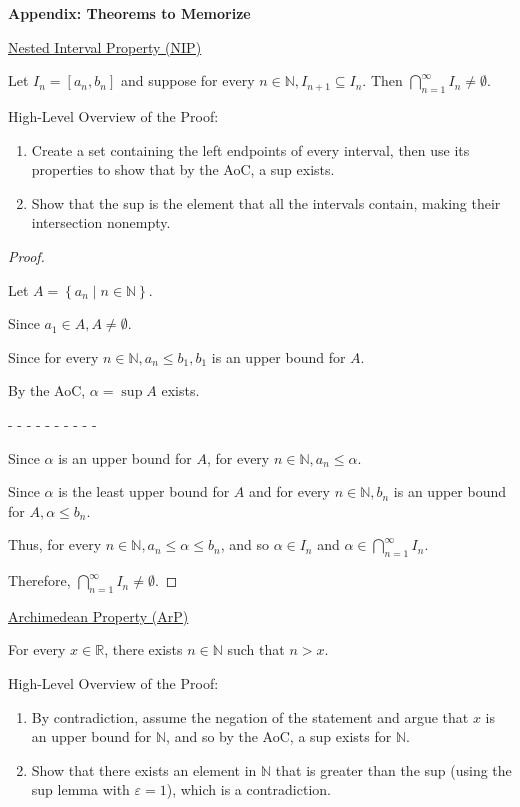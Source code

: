 \documentclass[12pt]{article}
\newcommand{\RR}{\mathbb{R}} %
\newcommand{\NN}{\mathbb{N}}
\newcommand\set[1]{\left\lbrace #1 \right\rbrace} %
\newcommand{\eps}{\varepsilon}
\begin{document}
\textbf{Appendix: Theorems to Memorize}

\hrulefill

\underline{Nested Interval Property (NIP)}

Let $I_n = [a_n, b_n]$ and suppose for every $n \in \NN, I_{n + 1} \subseteq {I_n}$. Then $\bigcap_{n = 1}^{\infty} I_n \ne \emptyset$.

\dotfill

High-Level Overview of the Proof:
\begin{enumerate}
\item Create a set containing the left endpoints of every interval, then use its properties to show that by the AoC, a sup exists.

\item Show that the sup is the element that all the intervals contain, making their intersection nonempty.
\end{enumerate}

\dotfill

\begin{proof}
$ $

Let $A = \set{a_n \mid n \in \NN}$.

Since $a_1 \in A, A \ne \emptyset$.

Since for every $n \in \NN, a_n \le b_1, b_1$ is an upper bound for $A$.

By the AoC, $\alpha = \sup A$ exists.

- - - - - - - - - -

Since $\alpha$ is an upper bound for $A$, for every $n \in \NN, a_n \le \alpha$.

Since $\alpha$ is the least upper bound for $A$ and for every $n \in \NN, b_n$ is an upper bound for $A, \alpha \le b_n$.

Thus, for every $n \in \NN, a_n \le \alpha \le b_n$, and so $\alpha \in I_n$ and $\alpha \in \bigcap_{n = 1}^{\infty} I_n$.

Therefore, $\bigcap_{n = 1}^{\infty} I_n \ne \emptyset$.
\end{proof}

\pagebreak

\underline{Archimedean Property (ArP)}

For every $x \in \RR$, there exists $n \in \NN$ such that $n > x$.

\dotfill

High-Level Overview of the Proof:

\begin{enumerate}
\item By contradiction, assume the negation of the statement and argue that $x$ is an upper bound for $\NN$, and so by the AoC, a sup exists for $\NN$.

\item Show that there exists an element in $\NN$ that is greater than the sup (using the sup lemma with $\eps = 1$), which is a contradiction.
\end{enumerate}
\end{document}
